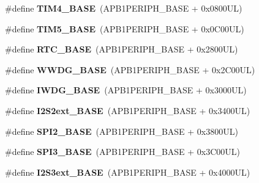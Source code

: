 \begin{DoxyCompactItemize}
\#define {\bfseries T\+I\+M4\+\_\+\+B\+A\+SE}~(A\+P\+B1\+P\+E\+R\+I\+P\+H\+\_\+\+B\+A\+SE + 0x0800\+U\+L)
\item 
\mbox{\label{group___peripheral__memory__map_ga3e1671477190d065ba7c944558336d7e}} 
\#define {\bfseries T\+I\+M5\+\_\+\+B\+A\+SE}~(A\+P\+B1\+P\+E\+R\+I\+P\+H\+\_\+\+B\+A\+SE + 0x0\+C00\+U\+L)
\item 
\mbox{\label{group___peripheral__memory__map_ga4265e665d56225412e57a61d87417022}} 
\#define {\bfseries R\+T\+C\+\_\+\+B\+A\+SE}~(A\+P\+B1\+P\+E\+R\+I\+P\+H\+\_\+\+B\+A\+SE + 0x2800\+U\+L)
\item 
\mbox{\label{group___peripheral__memory__map_ga9a5bf4728ab93dea5b569f5b972cbe62}} 
\#define {\bfseries W\+W\+D\+G\+\_\+\+B\+A\+SE}~(A\+P\+B1\+P\+E\+R\+I\+P\+H\+\_\+\+B\+A\+SE + 0x2\+C00\+U\+L)
\item 
\mbox{\label{group___peripheral__memory__map_ga8543ee4997296af5536b007cd4748f55}} 
\#define {\bfseries I\+W\+D\+G\+\_\+\+B\+A\+SE}~(A\+P\+B1\+P\+E\+R\+I\+P\+H\+\_\+\+B\+A\+SE + 0x3000\+U\+L)
\item 
\mbox{\label{group___peripheral__memory__map_gaa5f7b241ed5b756decd835300c9e7bc9}} 
\#define {\bfseries I2\+S2ext\+\_\+\+B\+A\+SE}~(A\+P\+B1\+P\+E\+R\+I\+P\+H\+\_\+\+B\+A\+SE + 0x3400\+U\+L)
\item 
\mbox{\label{group___peripheral__memory__map_gac3e357b4c25106ed375fb1affab6bb86}} 
\#define {\bfseries S\+P\+I2\+\_\+\+B\+A\+SE}~(A\+P\+B1\+P\+E\+R\+I\+P\+H\+\_\+\+B\+A\+SE + 0x3800\+U\+L)
\item 
\mbox{\label{group___peripheral__memory__map_gae634fe8faa6922690e90fbec2fc86162}} 
\#define {\bfseries S\+P\+I3\+\_\+\+B\+A\+SE}~(A\+P\+B1\+P\+E\+R\+I\+P\+H\+\_\+\+B\+A\+SE + 0x3\+C00\+U\+L)
\item 
\mbox{\label{group___peripheral__memory__map_ga89b61d6e6b09e94f3fccb7bef34e0263}} 
\#define {\bfseries I2\+S3ext\+\_\+\+B\+A\+SE}~(A\+P\+B1\+P\+E\+R\+I\+P\+H\+\_\+\+B\+A\+SE + 0x4000\+U\+L)

\end{DoxyCompactItemize}
